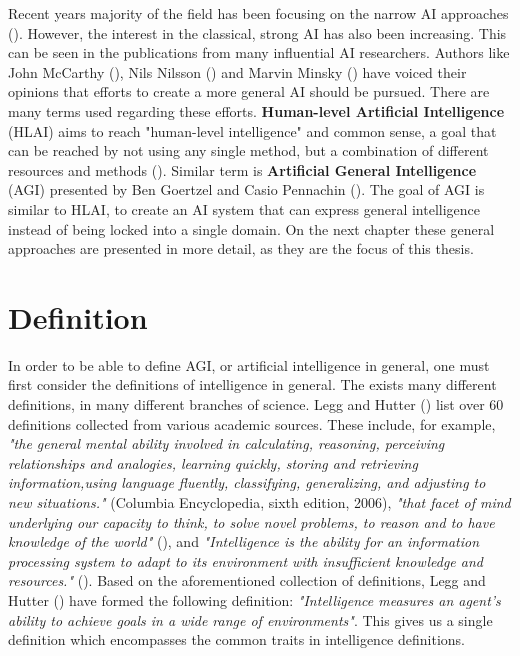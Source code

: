 \documentclass[utf8,english]{gradu3}
\begin{document}
Recent years majority of the field has been focusing on the narrow AI approaches (\cite{goertzel2007}). However, the interest in the classical, strong AI has also been increasing. This can be seen in the publications from many influential AI researchers. Authors like John McCarthy (\cite*{mccarthy2007}), Nils Nilsson (\cite*{nilsson2005}) and Marvin Minsky (\cite*{minsky2007}) have voiced their opinions that efforts to create a more general AI should be pursued. There are many terms used regarding these efforts. \textbf{Human-level Artificial Intelligence} (HLAI) aims to reach "human-level intelligence" and common sense, a goal that can be reached by not using any single method, but a combination of different resources and methods (\cite{minsky2004}).
Similar term is \textbf{Artificial General Intelligence} (AGI) presented by Ben Goertzel and Casio Pennachin (\cite*{goertzel2007}). The goal of AGI is similar to HLAI, to create an AI system that can express general intelligence instead of being locked into a single domain. On the next chapter these general approaches are presented in more detail, as they are the focus of this thesis.


\section{Definition}

In order to be able to define AGI, or artificial intelligence in general, one must first consider the definitions of intelligence in general. The exists many different definitions, in many different branches of science. Legg and Hutter (\cite*{legg2007}) list over 60 definitions collected from various academic sources. These include, for example, \emph{"the general mental ability involved in calculating, reasoning, perceiving relationships and analogies, learning quickly, storing and retrieving information,using language fluently, classifying, generalizing, and adjusting to new situations."} (Columbia Encyclopedia, sixth edition, 2006), \emph{"that facet of mind underlying our capacity to think, to solve novel problems, to reason and to have knowledge of the world"} (\cite{anderson2006}), and \emph{"Intelligence is the ability for an information processing system to adapt to its environment with insufficient knowledge and resources."} (\cite{wang1995}).
Based on the aforementioned collection of definitions, Legg and Hutter (\cite*{legg2007}) have formed the following definition: \emph{"Intelligence measures an agent's ability to achieve goals in a wide range of environments"}. This gives us a single definition which encompasses the common traits in intelligence definitions. 
\end{document}
